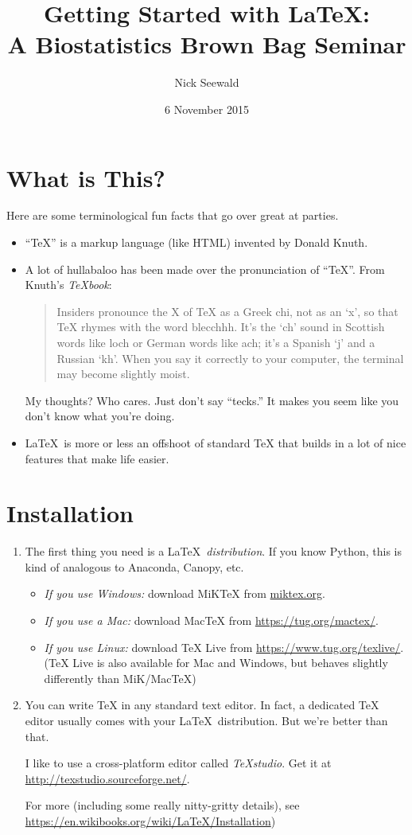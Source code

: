 \documentclass[12pt]{article}
\title{Getting Started with \LaTeX: \\ 
	\large{A Biostatistics Brown Bag Seminar}}
\author{Nick Seewald}
\date{6 November 2015} %
\begin{document}
	\maketitle
	
	\section{What is This?}
	
	Here are some terminological fun facts that go over great at parties.
	\begin{itemize}
		\item ``TeX'' is a markup language (like HTML) invented by Donald Knuth.
		\item A lot of hullabaloo has been made over the pronunciation of ``TeX''. From Knuth's \textit{TeXbook}:
		\begin{quote}
			Insiders pronounce the X of TeX as a Greek chi, not as an ‘x’, so that TeX rhymes with the word blecchhh. It’s the ‘ch’ sound in Scottish words like loch or German words like ach; it’s a Spanish ‘j’ and a Russian ‘kh’. When you say it correctly to your computer, the terminal may become slightly moist.
		\end{quote}
		My thoughts? Who cares. Just don't say ``tecks.'' It makes you seem like you don't know what you're doing.
		\item \LaTeX \ is more or less an offshoot of standard TeX that builds in a lot of nice features that make life easier.
	\end{itemize}
	
	\section{Installation}
	
	\begin{enumerate}
		\item The first thing you need is a \LaTeX \ \textit{distribution}. If you know Python, this is kind of analogous to Anaconda, Canopy, etc.
		\begin{itemize}
			\item \textit{If you use Windows:} download MiKTeX from \url{miktex.org}.
			\item \textit{If you use a Mac:} download MacTeX from \url{https://tug.org/mactex/}.
			\item \textit{If you use Linux:} download TeX Live from \url{https://www.tug.org/texlive/}. (TeX Live is also available for Mac and Windows, but behaves slightly differently than MiK/MacTeX)
		\end{itemize}
		\item You can write TeX in any standard text editor. In fact, a dedicated TeX editor usually comes with your \LaTeX \ distribution. But we're better than that.
		
		I like to use a cross-platform editor called \textit{TeXstudio}. Get it at \url{http://texstudio.sourceforge.net/}.
		
		For more (including some really nitty-gritty details), see \url{https://en.wikibooks.org/wiki/LaTeX/Installation}) \cite{wikibooks}
	\end{enumerate}
	
\end{document}
